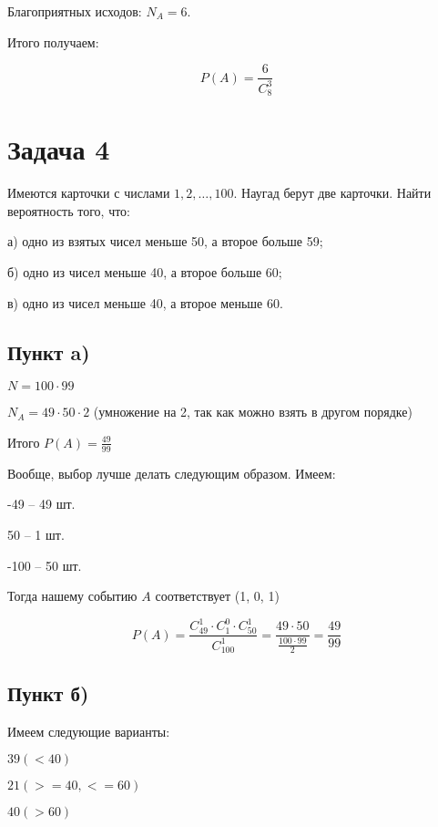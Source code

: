 \documentclass{article}
\begin{document}
Благоприятных исходов: $N_A = 6$.

Итого получаем:

$$P(A) = \frac{6}{C_8^3}$$

\section{Задача 4}

Имеются карточки с числами $1, 2, \ldots, 100$. Наугад берут две карточки. Найти вероятность того, что:

а) одно из взятых чисел меньше 50, а второе больше 59;

б) одно из чисел меньше 40, а второе больше 60;

в) одно из чисел меньше 40, а второе меньше 60.

\quad

\subsection{Пункт a)}

$N = 100 \cdot 99$

$N_A = 49 \cdot 50 \cdot 2$ (умножение на 2, так как можно взять в другом порядке)

Итого $P(A) = \frac{49}{99}$

\quad

Вообще, выбор лучше делать следующим образом. Имеем:



\begin{center}
-49 \quad-- 49 шт.

50 \qquad-- 1 шт.

-100 \quad-- 50 шт.
\end{center}


Тогда нашему событию $A$ соответствует (1, 0, 1)

$$P(A) = \frac{C_{49}^1 \cdot C_1^0 \cdot C_{50}^1}{C_{100}^1} = \frac{49 \cdot 50}{\frac{100 \cdot 99}{2}} = \frac{49}{99}$$

\subsection{Пункт б)}

Имеем следующие варианты:

\begin{center}
$39 (<40)$

\qquad\quad$21 (>= 40, <= 60)$

$40 (>60)$
\end{center}
\end{document}
